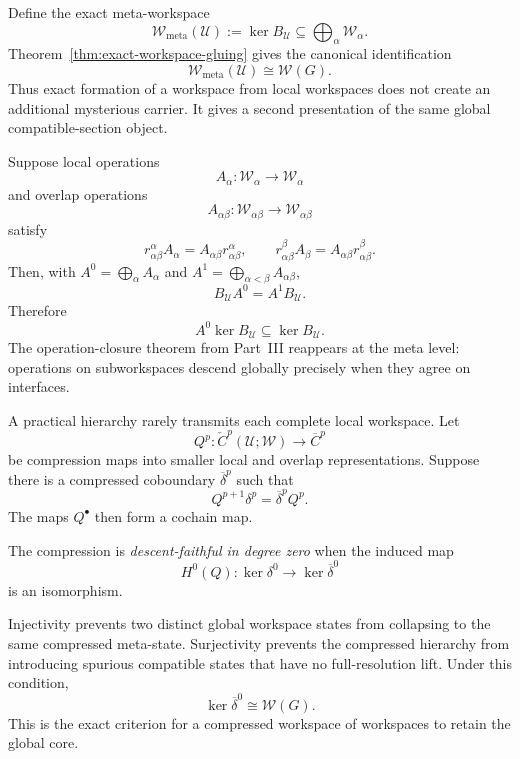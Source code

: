 
Define the exact meta-workspace
\[
\boxed{
\mathscr W_{\mathrm{meta}}(\mathcal U)
:=
\ker B_{\mathcal U}
\subseteq
\bigoplus_\alpha\mathscr W_\alpha.
}
\]
Theorem~\ref{thm:exact-workspace-gluing} gives the canonical identification
\[
\boxed{
\mathscr W_{\mathrm{meta}}(\mathcal U)
\cong
\mathscr W(G).
}
\]
Thus exact formation of a workspace from local workspaces does not create an
additional mysterious carrier. It gives a second presentation of the same
global compatible-section object.

Suppose local operations
\[
A_\alpha:\mathscr W_\alpha\to\mathscr W_\alpha
\]
and overlap operations
\[
A_{\alpha\beta}:\mathscr W_{\alpha\beta}\to
\mathscr W_{\alpha\beta}
\]
satisfy
\[
r_{\alpha\beta}^{\alpha}A_\alpha
=
A_{\alpha\beta}r_{\alpha\beta}^{\alpha},
\qquad
r_{\alpha\beta}^{\beta}A_\beta
=
A_{\alpha\beta}r_{\alpha\beta}^{\beta}.
\]
Then, with \(A^0=\bigoplus_\alpha A_\alpha\) and
\(A^1=\bigoplus_{\alpha<\beta}A_{\alpha\beta}\),
\[
B_{\mathcal U}A^0=A^1B_{\mathcal U}.
\]
Therefore
\[
A^0\ker B_{\mathcal U}\subseteq\ker B_{\mathcal U}.
\]
The operation-closure theorem from Part~III reappears at the meta level:
operations on subworkspaces descend globally precisely when they agree on
interfaces.


A practical hierarchy rarely transmits each complete local workspace. Let
\[
Q^p:\check C^p(\mathcal U;\mathscr W)\to\overline C^p
\]
be compression maps into smaller local and overlap representations. Suppose
there is a compressed coboundary \(\overline\delta^p\) such that
\[
\boxed{
Q^{p+1}\delta^p
=
\overline\delta^p Q^p.
}
\]
The maps \(Q^\bullet\) then form a cochain map.

\begin{definition}\label{def:descent-faithful}
The compression is \emph{descent-faithful in degree zero} when the induced map
\[
\boxed{
H^0(Q):
\ker\delta^0
\longrightarrow
\ker\overline\delta^0
}
\]
is an isomorphism.
\end{definition}

Injectivity prevents two distinct global workspace states from collapsing to
the same compressed meta-state. Surjectivity prevents the compressed hierarchy
from introducing spurious compatible states that have no full-resolution
lift. Under this condition,
\[
\boxed{
\ker\overline\delta^0
\cong
\mathscr W(G).
}
\]
This is the exact criterion for a compressed workspace of workspaces to retain
the global core.

